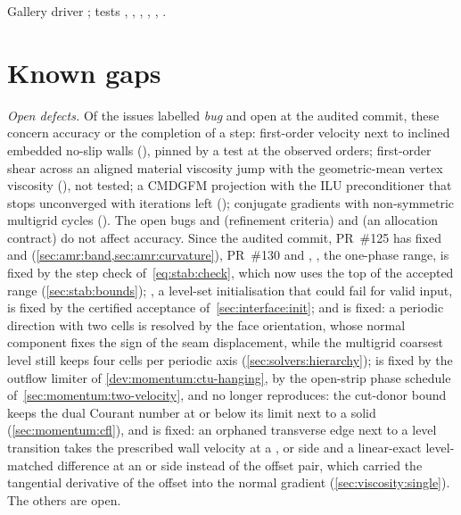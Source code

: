 \begin{implnote}
Gallery driver ; tests
,
,
,
,
,
.
\end{implnote}

\section{Known gaps}\label{sec:verif:gaps}
\emph{Open defects.} Of the issues labelled \emph{bug} and open at the audited
commit, these concern accuracy or the completion of a step: first-order
velocity next to inclined embedded no-slip walls (), pinned by a
test at the observed orders; first-order shear across an aligned material viscosity jump
with the geometric-mean vertex viscosity (), not tested; a
CMDGFM projection with the ILU
preconditioner that stops unconverged with iterations left ();
conjugate gradients with non-symmetric multigrid cycles (). The open
bugs  and  (refinement criteria) and  (an
allocation contract) do
not affect accuracy. Since
the audited commit, PR~\#125 has fixed  and 
(\cref{sec:amr:band,sec:amr:curvature}), PR~\#130  and
, , the one-phase  range, is fixed by the
step check of~\cref{eq:stab:check}, which now uses the top of the accepted
range (\cref{sec:stab:bounds}); , a level-set initialisation
that could fail for valid input, is fixed by the certified acceptance
of~\cref{sec:interface:init}; and  is fixed: a periodic direction
with two cells is resolved by the face orientation, whose normal component
fixes the sign of the seam displacement, while the multigrid coarsest level
still keeps four cells per periodic axis (\cref{sec:solvers:hierarchy});
 is fixed by the outflow limiter of
\cref{dev:momentum:ctu-hanging},  by the open-strip phase schedule
of~\cref{sec:momentum:two-velocity}, and  no longer reproduces: the
cut-donor bound keeps the dual Courant number at or below its limit next to a
solid (\cref{sec:momentum:cfl}), and  is fixed: an orphaned
transverse edge next to a level transition takes the prescribed wall velocity
at a ,  or  side and a
linear-exact level-matched difference at an  or
 side instead of the offset pair, which carried
the tangential derivative of the offset into the normal gradient
(\cref{sec:viscosity:single}). The others are open.

